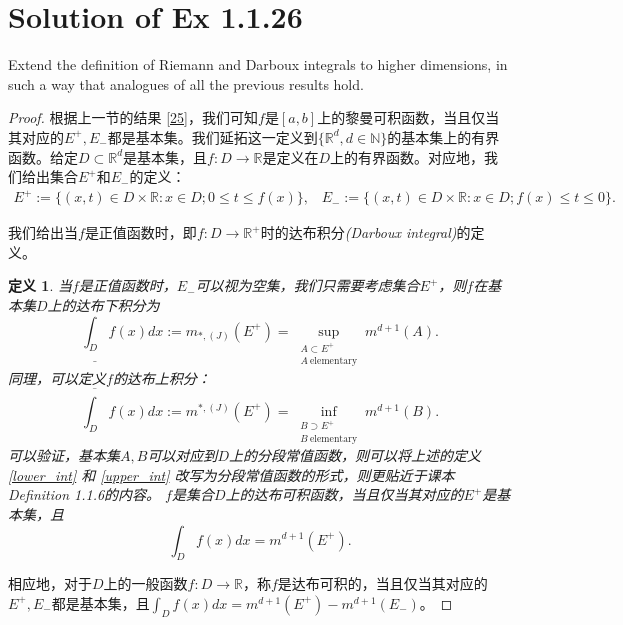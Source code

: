 \documentclass[reqno,a4paper,14pt]{amsart}
\newtheorem{definition}[theorem]{定义}
\begin{document}
\section{Solution of Ex 1.1.26}
Extend the definition of Riemann and Darboux integrals to higher dimensions, in such a way that analogues of all the previous results hold.
\begin{proof}
    根据上一节的结果 \ref{25}，我们可知$f$是$[a,b]$上的黎曼可积函数，当且仅当其对应的$E^+,E_-$都是基本集。我们延拓这一定义到$\{\mathbb{R}^d,d\in\mathbb{N}\}$的基本集上的有界函数。给定$D\subset \mathbb{R}^d$是基本集，且$f:D\to\mathbb{R}$是定义在$D$上的有界函数。对应地，我们给出集合$E^+$和$E_-$的定义：
    \begin{equation*}
        \begin{split}
            E^+:=\{(x,t)\in D\times \mathbb{R}:x\in D; 0\leq t\leq f(x)\},\;\;\;E_-:=\{(x,t)\in D\times \mathbb{R}:x\in D; f(x)\leq t\leq 0\}.
        \end{split}
    \end{equation*}
    
    我们给出当$f$是正值函数时，即$f:D\to\mathbb{R}^+$时的达布积分\textit{(Darboux integral)}的定义。
    \begin{definition}
        当$f$是正值函数时，$E_-$可以视为空集，我们只需要考虑集合$E^+$，则$f$在基本集$D$上的达布下积分为
        \begin{equation}
            \underline{\int_D} f(x)dx := m_{*,(J)}(E^+)=\sup_{\substack{A\subset E^+\\A\ \mathrm{elementary}}} m^{d+1}(A).
            \label{lower_int}
        \end{equation}
        同理，可以定义$f$的达布上积分：
        \begin{equation}
            \overline{\int_D} f(x)dx := m^{*,(J)}(E^+)=\inf_{\substack{B\supset E^+\\ B\ \mathrm{elementary}}} m^{d+1}(B).
            \label{upper_int}
        \end{equation}
        可以验证，基本集$A,B$可以对应到$D$上的分段常值函数，则可以将上述的定义 \eqref{lower_int} 和 \eqref{upper_int} 改写为分段常值函数的形式，则更贴近于课本Definition 1.1.6的内容。
        $f$是集合$D$上的达布可积函数，当且仅当其对应的$E^+$是基本集，且
    \begin{equation*}
        \int_D f(x)dx =m^{d+1}(E^+).
    \end{equation*}
    \end{definition}
    相应地，对于$D$上的一般函数$f:D\to\mathbb{R}$，称$f$是达布可积的，当且仅当其对应的$E^+,E_-$都是基本集，且$\int_D f(x)dx=m^{d+1}(E^+)-m^{d+1}(E_-)$。
\end{proof}
\end{document}

